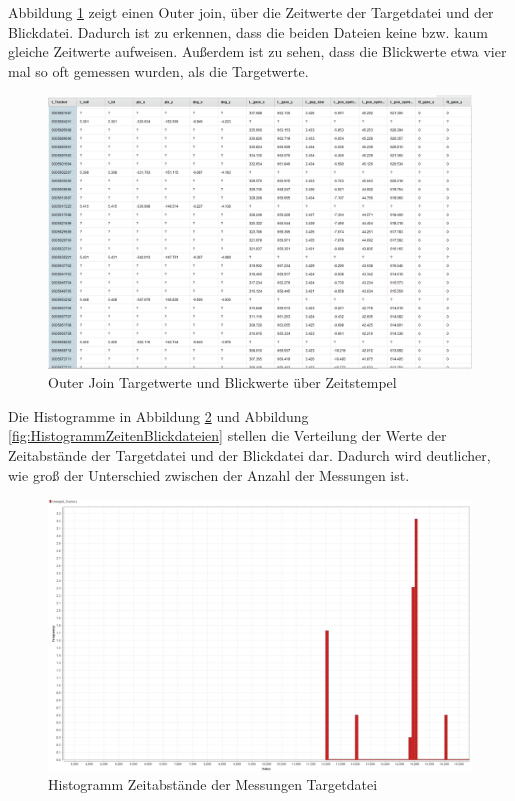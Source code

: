 Abbildung \ref{fig:OuterJoin} zeigt einen Outer join, \"uber die Zeitwerte der Targetdatei und der Blickdatei. Dadurch ist zu erkennen, dass die beiden Dateien keine bzw. kaum gleiche Zeitwerte aufweisen. Au\ss{}erdem ist zu sehen, dass die Blickwerte etwa vier mal so oft gemessen wurden, als die Targetwerte.

\begin{figure}[H]
	\noindent \begin{centering}
		\includegraphics[width=15cm]{pics/OuterJoin.png}
		\par\end{centering}
	\caption{\label{fig:OuterJoin}Outer Join Targetwerte und Blickwerte \"uber Zeitstempel \cite{BilderExplorativeDatenanalyseBoersch}}
\end{figure}

Die Histogramme in Abbildung \ref{fig:HistogrammZeitenTargetdateien} und Abbildung \ref{fig:HistogrammZeitenBlickdateien} stellen die Verteilung der Werte der Zeitabst\"ande der Targetdatei und der Blickdatei dar. Dadurch wird deutlicher, wie gro\ss{} der Unterschied zwischen der Anzahl der Messungen ist.

\begin{figure}[H]
	\noindent \begin{centering}
		\includegraphics[width=15cm]{pics/HistogrammZeitenTargetdateien.png}
		\par\end{centering}
	\caption{\label{fig:HistogrammZeitenTargetdateien}Histogramm Zeitabst\"ande der Messungen Targetdatei \cite{BilderExplorativeDatenanalyseBoersch}}
\end{figure}

